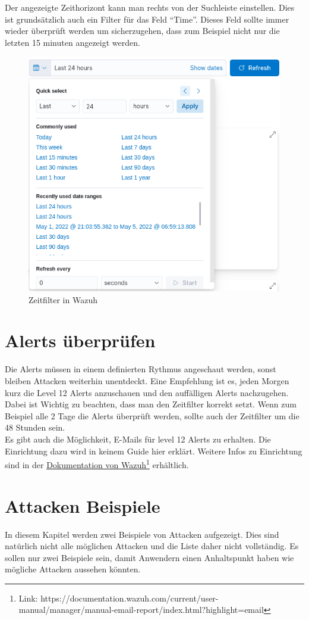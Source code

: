 Der angezeigte Zeithorizont kann man rechts von der Suchleiste einstellen.
Dies ist grundsätzlich auch ein Filter für das Feld ``Time''.
Dieses Feld sollte immer wieder überprüft werden um sicherzugehen, dass zum Beispiel nicht nur die letzten 15 minuten angezeigt werden.
\begin{figure}[H]
    \centering
    \includegraphics[width=0.7\linewidth]{../img/zeitfilter.png}
    \caption{Zeitfilter in Wazuh}
\end{figure}

\section{Alerts überprüfen}
Die Alerts müssen in einem definierten Rythmus angeschaut werden, sonst bleiben Attacken weiterhin unentdeckt.
Eine Empfehlung ist es, jeden Morgen kurz die Level 12 Alerts anzuschauen und den auffälligen Alerts nachzugehen.
Dabei ist Wichtig zu beachten, dass man den Zeitfilter korrekt setzt. 
Wenn zum Beispiel alle 2 Tage die Alerts überprüft werden, sollte auch der Zeitfilter um die 48 Stunden sein.\\

Es gibt auch die Möglichkeit, E-Mails für level 12 Alerts zu erhalten.
Die Einrichtung dazu wird in keinem Guide hier erklärt.
Weitere Infos zu Einrichtung sind in der \href{https://documentation.wazuh.com/current/user-manual/manager/manual-email-report/index.html?highlight=email}{Dokumentation von Wazuh}\footnote{Link: https://documentation.wazuh.com/current/user-manual/manager/manual-email-report/index.html?highlight=email} erhältlich.


\section{Attacken Beispiele}
In diesem Kapitel werden zwei Beispiele von Attacken aufgezeigt.
Dies sind natürlich nicht alle möglichen Attacken und die Liste daher nicht vollständig.
Es sollen nur zwei Beispiele sein, damit Anwendern einen Anhaltspunkt haben wie mögliche Attacken aussehen könnten.\\

